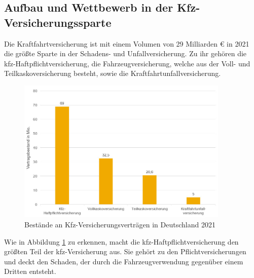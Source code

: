 

\subsection{Aufbau und Wettbewerb in der Kfz-Versicherungssparte}

Die Kraftfahrtversicherung ist mit einem Volumen von 29 Milliarden € in 2021 die größte Sparte in der Schadens- und Unfallversicherung.\autocite[Vgl.][]{GDVSUV} Zu ihr gehören die \ac{kfz}-Haftpflichtversicherung, die Fahrzeugversicherung, welche aus der Voll- und Teilkaskoversicherung besteht, sowie die Kraftfahrtunfallversicherung.\autocite[Vgl.][S. 8]{MURINGER2000}

\begin{figure}[h]
    \centering
    \includegraphics[width=0.9\textwidth]{img/KfzV_Bestände_an_Verträgen_2021.jpg}
    \caption[Bestände an Kfz-Versicherungsverträgen in Deutschland 2021]{Bestände an Kfz-Versicherungsverträgen in Deutschland 2021\autocite{KfzVVBestand}}
    \label{fig:KfzVVBestand}
\end{figure}

Wie in Abbildung \ref{fig:KfzVVBestand} zu erkennen, macht die \ac{kfz}-Haftpflichtversicherung den größten Teil der \ac{kfz}-Versicherung aus. Sie gehört zu den Pflichtversicherungen und deckt den Schaden, der durch die Fahrzeugverwendung gegenüber einem Dritten entsteht. \autocite[Vgl.][S. 81]{STADLER2008}


